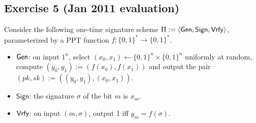 \subsection{Exercise 5 (Jan 2011 evaluation)}
\label{subsec:4b.5}
Consider the following one-time signature scheme $\Pi:=\langle \operatorname{\mathsf{Gen}},
\mathsf{Sign}, \operatorname{\mathsf{Vrfy}}\rangle$, parameterized by a PPT function $f: \{0,1\}^*
\rightarrow \{0,1\}^*$.
\begin{itemize}
\item $\operatorname{\mathsf{Gen}}$: on input $1^n$, select $(x_0,x_1) \leftarrow
  \{0,1\}^n\times \{0,1\}^n$ uniformly at random, compute $(y_0,y_1) :=
  (f(x_0),f(x_1))$ and output the pair $(pk,sk):=
  ((y_0,y_1),(x_0,x_1))$.
\item $\mathsf{Sign}$: the signature $\sigma$ of the bit $m$ is $x_m$.
\item $\operatorname{\mathsf{Vrfy}}$: on input $(m,\sigma)$, output 1 iff $y_m = f(\sigma)$.
\end{itemize}

